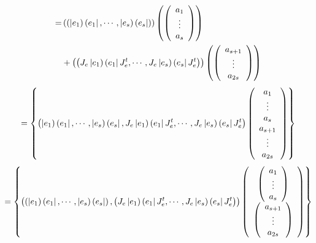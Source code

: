 \documentclass[aps,preprint]{revtex4}%
\begin{document}
\begin{align}
=  &  \left(  \left(  \left\vert e_{1}\right)  \left(  e_{1}\right\vert
,\cdots,\left\vert e_{s}\right)  \left(  e_{s}\right\vert \right)  \right)
\left(  \left(
\begin{array}
[c]{c}%
a_{1}\\
\vdots\\
a_{s}%
\end{array}
\right)  \right) \\
&  +\left(  \left(  J_{e}\left\vert e_{1}\right)  \left(  e_{1}\right\vert
J_{e}^{t},\cdots,J_{e}\left\vert e_{s}\right)  \left(  e_{s}\right\vert
J_{e}^{t}\right)  \right)  \left(  \left(
\begin{array}
[c]{c}%
a_{s+1}\\
\vdots\\
a_{2s}%
\end{array}
\right)  \right)
\end{align}%
\begin{equation}
=\left\{  \left(  \left\vert e_{1}\right)  \left(  e_{1}\right\vert
,\cdots,\left\vert e_{s}\right)  \left(  e_{s}\right\vert ,J_{e}\left\vert
e_{1}\right)  \left(  e_{1}\right\vert J_{e}^{t},\cdots,J_{e}\left\vert
e_{s}\right)  \left(  e_{s}\right\vert J_{e}^{t}\right)  \left(
\begin{array}
[c]{c}%
a_{1}\\
\vdots\\
a_{s}\\
a_{s+1}\\
\vdots\\
a_{2s}%
\end{array}
\right)  \right\}
\end{equation}%
\begin{equation}
=\left\{  \left(  \left(  \left\vert e_{1}\right)  \left(  e_{1}\right\vert
,\cdots,\left\vert e_{s}\right)  \left(  e_{s}\right\vert \right)  ,\left(
J_{e}\left\vert e_{1}\right)  \left(  e_{1}\right\vert J_{e}^{t},\cdots
,J_{e}\left\vert e_{s}\right)  \left(  e_{s}\right\vert J_{e}^{t}\right)
\right)  \left(
\begin{array}
[c]{c}%
\left(
\begin{array}
[c]{c}%
a_{1}\\
\vdots\\
a_{s}%
\end{array}
\right) \\
\left(
\begin{array}
[c]{c}%
a_{s+1}\\
\vdots\\
a_{2s}%
\end{array}
\right)
\end{array}
\right)  \right\}
\end{equation}%
\end{document}

